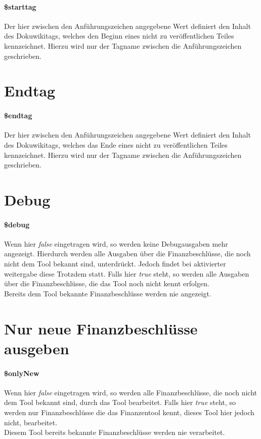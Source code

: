 \documentclass[12pt,parskip=full, pagea4]{scrreprt}
\begin{document}
	\paragraph{\$starttag} Der hier zwischen den Anführungszeichen angegebene Wert definiert den Inhalt des Dokuwikitags, welches den Beginn eines nicht zu veröffentlichen Teiles kennzeichnet. Hierzu wird nur der Tagname zwischen die Anführungszeichen geschrieben.
	
	\section{Endtag}
	\paragraph{\$endtag} Der hier zwischen den Anführungszeichen angegebene Wert definiert den Inhalt des Dokuwikitags, welches das Ende eines nicht zu veröffentlichen Teiles kennzeichnet. Hierzu wird nur der Tagname zwischen die Anführungszeichen geschrieben.
		
	\section{Debug}
	\paragraph{\$debug} Wenn hier \textit{false} eingetragen wird, so werden keine Debugausgaben mehr angezeigt. Hierdurch werden alle Ausgaben über die Finanzbeschlüsse, die noch nicht dem Tool bekannt sind, unterdrückt. Jedoch findet bei aktivierter weitergabe diese Trotzdem statt. Falls hier \textit{true} steht, so werden alle Ausgaben über die Finanzbeschlüsse, die das Tool noch nicht kennt erfolgen. \\
	Bereits dem Tool bekannte Finanzbeschlüsse werden nie angezeigt.
	
	\section{Nur neue Finanzbeschlüsse ausgeben}
	\paragraph{\$onlyNew} Wenn hier \textit{false} eingetragen wird, so werden alle Finanzbeschlüsse, die noch nicht dem Tool bekannt sind, durch das Tool bearbeitet. Falls hier \textit{true} steht, so werden nur Finanzbeschlüsse die das Finanzentool kennt, dieses Tool hier jedoch nicht, bearbeitet. \\
	Diesem Tool bereits bekannte Finanzbeschlüsse werden nie verarbeitet.
	
\end{document}
